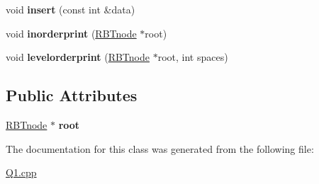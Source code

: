 \begin{DoxyCompactItemize}
\item 
\mbox{\label{classRedBlackTree_a10dd221bca80bdeddb68a660f87cc645}} 
void {\bfseries insert} (const int \&data)
\item 
\mbox{\label{classRedBlackTree_ae4cf8dcb57bd6def3d47704870f3da0f}} 
void {\bfseries inorderprint} (\hyperlink{classRBTnode}{R\+B\+Tnode} $\ast$root)
\item 
\mbox{\label{classRedBlackTree_a6d3512b95d8fc4615ce5a6b98b6dbde7}} 
void {\bfseries levelorderprint} (\hyperlink{classRBTnode}{R\+B\+Tnode} $\ast$root, int spaces)
\end{DoxyCompactItemize}
\subsection*{Public Attributes}
\begin{DoxyCompactItemize}
\item 
\mbox{\label{classRedBlackTree_a93317777ae44f8805109708940cf9c70}} 
\hyperlink{classRBTnode}{R\+B\+Tnode} $\ast$ {\bfseries root}
\end{DoxyCompactItemize}


The documentation for this class was generated from the following file\+:\begin{DoxyCompactItemize}
\item 
\hyperlink{Q1_8cpp}{Q1.\+cpp}\end{DoxyCompactItemize}
